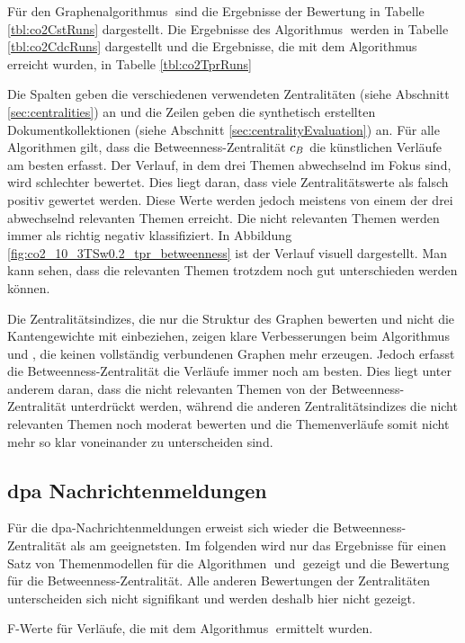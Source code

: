 Für den Graphenalgorithmus \CST$\;$sind die Ergebnisse der Bewertung in Tabelle \ref{tbl:co2CstRuns} dargestellt.  Die Ergebnisse des Algorithmus \CDC$\;$werden in Tabelle \ref{tbl:co2CdcRuns} dargestellt und die Ergebnisse, die mit dem Algorithmus \TPR$\;$erreicht wurden, in Tabelle \ref{tbl:co2TprRuns}

Die Spalten geben die verschiedenen verwendeten Zentralitäten (siehe Abschnitt \ref{sec:centralities}) an und die Zeilen geben die synthetisch erstellten Dokumentkollektionen (siehe Abschnitt \ref{sec:centralityEvaluation}) an. Für alle Algorithmen gilt, dass die Betweenness-Zentralität $c_{B}$ die künstlichen Verläufe am besten erfasst. Der Verlauf, in dem drei Themen abwechselnd im Fokus sind, wird schlechter bewertet. Dies liegt daran, dass viele Zentralitätswerte als falsch positiv gewertet werden. Diese Werte werden jedoch meistens von einem der drei abwechselnd relevanten Themen erreicht. Die nicht relevanten Themen werden immer als richtig negativ klassifiziert. In Abbildung \ref{fig:co2_10_3TSw0.2_tpr_betweenness} ist der Verlauf visuell dargestellt. Man kann sehen, dass die relevanten Themen trotzdem noch gut unterschieden werden können. 

Die Zentralitätsindizes, die nur die Struktur des Graphen bewerten und nicht die Kantengewichte mit einbeziehen, zeigen klare Verbesserungen beim Algorithmus \CDC$\;$und \TPR, die keinen vollständig verbundenen Graphen mehr erzeugen. Jedoch erfasst die Betweenness-Zentralität die Verläufe immer noch am besten. Dies liegt unter anderem daran, dass die nicht relevanten Themen von der Betweenness-Zentralität unterdrückt werden, während die anderen Zentralitätsindizes die nicht relevanten Themen noch moderat bewerten und die Themenverläufe somit nicht mehr so klar voneinander zu unterscheiden sind. 

\subsection{dpa Nachrichtenmeldungen}

Für die dpa-Nachrichtenmeldungen erweist sich wieder die Betweenness-Zentralität als am geeignetsten. Im folgenden wird nur das Ergebnisse für einen Satz von Themenmodellen für die Algorithmen \CST$\;$und \CDC$\;$gezeigt und die Bewertung für die Betweenness-Zentralität. Alle anderen Bewertungen der Zentralitäten unterscheiden sich nicht signifikant und werden deshalb hier nicht gezeigt.

\begin{table}[!ht]
\centering

\caption{F-Werte für Verläufe, die mit dem Algorithmus \CST$\;$ermittelt wurden.}
\label{tbl:dpaCST}
\end{table}

